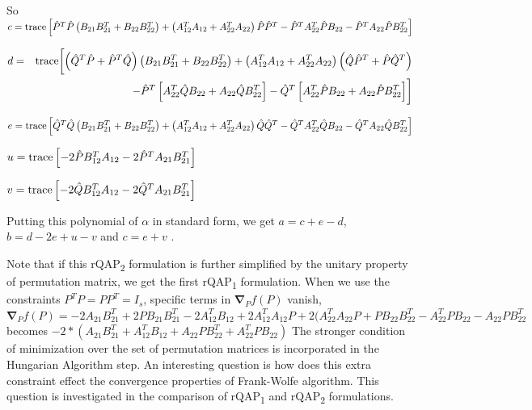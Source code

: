 \documentclass[12pt,oneside,final]{thesis}\usepackage[]{graphicx}\usepackage[]{color}
\begin{document}
So $c=\textup{trace}\left[\hat{P}^{T}\hat{P}\left(B_{21}B_{21}^{T}+B_{22}B_{22}^{T}\right)+\left(A_{12}^{T}A_{12}+A_{22}^{T}A_{22}\right)\hat{P}\hat{P}^{T}-\hat{P}^{T}A_{22}^{T}\hat{P}B_{22}-\hat{P}^{T}A_{22}\hat{P}B_{22}^{T}\right]$

\noindent 
\begin{eqnarray*}
d & = & \textup{trace}\biggl[\left(\hat{Q}^{T}\hat{P}+\hat{P}^{T}\hat{Q}\right)\left(B_{21}B_{21}^{T}+B_{22}B_{22}^{T}\right)+\left(A_{12}^{T}A_{12}+A_{22}^{T}A_{22}\right)\left(\hat{Q}\hat{P}^{T}+\hat{P}\hat{Q}^{T}\right)\\
 &  & -\hat{P}^{T}\left[A_{22}^{T}\hat{Q}B_{22}+A_{22}\hat{Q}B_{22}^{T}\right]-\hat{Q}^{T}\left[A_{22}^{T}\hat{P}B_{22}+A_{22}\hat{P}B_{22}^{T}\right]\biggr]
\end{eqnarray*}


$e=\textup{trace}\left[\hat{Q}^{T}\hat{Q}\left(B_{21}B_{21}^{T}+B_{22}B_{22}^{T}\right)+\left(A_{12}^{T}A_{12}+A_{22}^{T}A_{22}\right)\hat{Q}\hat{Q}^{T}-\hat{Q}^{T}A_{22}^{T}\hat{Q}B_{22}-\hat{Q}^{T}A_{22}\hat{Q}B_{22}^{T}\right]$

$u=\textup{trace}\left[-2\hat{P}B_{12}^{T}A_{12}-2\hat{P}^{T}A_{21}B_{21}^{T}\right]$

$v=\textup{trace}\left[-2\hat{Q}B_{12}^{T}A_{12}-2\hat{Q}^{T}A_{21}B_{21}^{T}\right]$

Putting this polynomial of $\alpha$ in standard form, we get $a=c+e-d$,
$b=d-2e+u-v$ and $c=e+v$ .

Note that if this rQAP\textsubscript{2} formulation is further simplified  by the unitary property of permutation  matrix, we get the first rQAP\textsubscript{1} formulation. When we use the constraints $P^TP=PP^T=I_{s}$, specific terms in $\boldsymbol{\nabla}_{P}f(P)$ vanish,
$\boldsymbol{\nabla}_{P}f(P)=-2A_{21}B_{21}^{T}+2PB_{21}B_{21}^{T}-2A_{12}^{T}B_{12}+2A_{12}^{T}A_{12}P+2(A_{22}^{T}A_{22}P+PB_{22}B_{22}^{T}-A_{22}^{T}PB_{22}-A_{22}PB_{22}^{T}$
becomes $-2*(A_{21}B_{21}^T+A_{12}^TB_{12}+A_{22}PB_{22}^T+A_{22}^TPB_{22})$
The stronger condition of minimization over the set of permutation matrices is incorporated in the Hungarian Algorithm step.
An interesting question is how does this extra constraint effect the convergence properties of Frank-Wolfe algorithm.  This question is investigated in the comparison of rQAP\textsubscript{1} and rQAP\textsubscript{2} formulations.  
\end{document}
